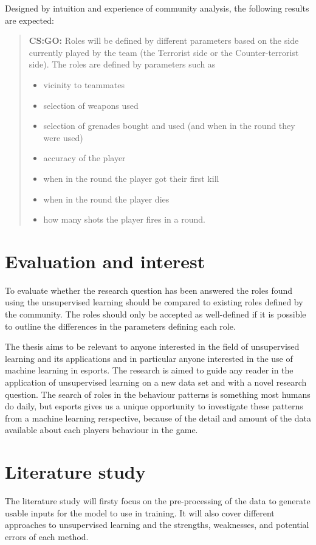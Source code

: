 \documentclass{article}
\begin{document}
Designed by intuition and experience of community analysis, the following results are expected:
\begin{quote}
    {\bf CS:GO:} Roles will be defined by different parameters based on the side currently played by the team (the Terrorist side or the Counter-terrorist side). The roles are defined by parameters such as
    \begin{itemize}
        \item vicinity to teammates
        \item selection of weapons used
        \item selection of grenades bought and used (and when in the round they were used)
        \item accuracy of the player
        \item when in the round the player got their first kill
        \item when in the round the player dies
        \item how many shots the player fires in a round.
    \end{itemize}
\end{quote}

\section{Evaluation and interest}
To evaluate whether the research question has been answered the roles found using the unsupervised learning should be compared to existing roles defined by the community. The roles should only be accepted as well-defined if it is possible to outline the differences in the parameters defining each role.

The thesis aims to be relevant to anyone interested in the field of unsupervised learning and its applications and in particular anyone interested in the use of machine learning in esports. The research is aimed to guide any reader in the application of unsupervised learning on a new data set and with a novel research question. The search of roles in the behaviour patterns is something most humans do daily, but esports gives us a unique opportunity to investigate these patterns from a machine learning rerspective, because of the detail and amount of the data available about each players behaviour in the game.

\section{Literature study}
The literature study will firsty focus on the pre-processing of the data to generate usable inputs for the model to use in training. It will also cover different approaches to unsupervised learning and the strengths, weaknesses, and potential errors of each method. 
\end{document}
